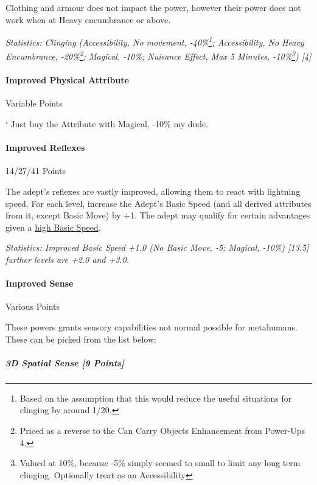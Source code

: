 \begin{multicols*}{3}
	Clothing and armour does not impact the power, however their power does not work when at Heavy encumbrance or above.

	\textcolor{OliveGreen}{\textit{Statistics: Clinging (Accessibility, No movement, -40\%\footnote{Based on the assumption that this would reduce the useful situations for clinging by around 1/20.}; Accessibility, No Heavy Encumbrance, -20\%\footnote{Priced as a reverse to the Can Carry Objects Enhancement from Power-Ups 4.}; Magical, -10\%; Nuisance Effect, Max 5 Minutes, -10\%\footnote{Valued at 10\%, because -5\% simply seemed to small to limit any long term clinging. Optionally treat as an Accessibility}) [4] }}

	\paragraph{Improved Physical Attribute}
	\begin{flushright}
		Variable Points
	\end{flushright}
	`
	Just buy the Attribute with Magical, -10\% my dude.
	
	\paragraph{Improved Reflexes}
	\begin{flushright}
		14/27/41 Points
	\end{flushright}

	The adept's reflexes are vastly improved, allowing them to react with lightning speed. For each level, increase the Adept's Basic Speed (and all derived attributes from it, except Basic Move) by +1. The adept may qualify for certain advantages given a \hyperref[high_basic_speed]{high Basic Speed}.

	\textcolor{OliveGreen}{\textit{Statistics: Improved Basic Speed +1.0 (No Basic Move, -5; Magical, -10\%) [13.5] further levels are +2.0 and +3.0. }}

	\paragraph{Improved Sense}
	\begin{flushright}
		Various Points
	\end{flushright}

	These powers grants sensory capabilities not normal possible for metahumans. These can be picked from the list below:
	
	\subparagraph{3D Spatial Sense [9 Points]}
	

\end{multicols*}
